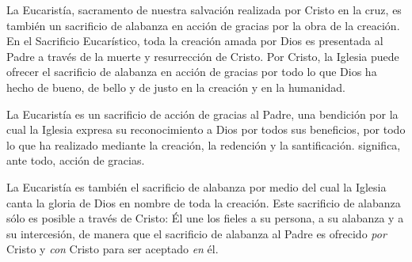 \begin{ccebody}
	

 La Eucaristía, sacramento de nuestra salvación realizada por Cristo en la cruz, es también un sacrificio de alabanza en acción de gracias por la obra de la creación. En el Sacrificio Eucarístico, toda la creación amada por Dios es presentada al Padre a través de la muerte y resurrección de Cristo. Por Cristo, la Iglesia puede ofrecer el sacrificio de alabanza en acción de gracias por todo lo que Dios ha hecho de bueno, de bello y de justo en la creación y en la humanidad.

 La Eucaristía es un sacrificio de acción de gracias al Padre, una bendición por la cual la Iglesia expresa su reconocimiento a Dios por todos sus beneficios, por todo lo que ha realizado mediante la creación, la redención y la santificación.  significa, ante todo, acción de gracias.

 La Eucaristía es también el sacrificio de alabanza por medio del cual la Iglesia canta la gloria de Dios en nombre de toda la creación. Este sacrificio de alabanza sólo es posible a través de Cristo: Él une los fieles a su persona, a su alabanza y a su intercesión, de manera que el sacrificio de alabanza al Padre es ofrecido \textit{por} Cristo y \textit{con} Cristo para ser aceptado \textit{en} él.
\end{ccebody}

\newpage
{} 

